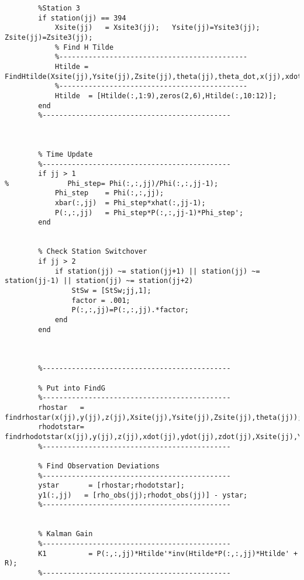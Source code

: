 \documentclass[12pt,a4paper,oneside]{article}
\numberwithin{equation}{section}   		%
\begin{document}
\begin{appendices}
\begin{lstlisting}
        %Station 3
        if station(jj) == 394
            Xsite(jj)   = Xsite3(jj);   Ysite(jj)=Ysite3(jj);   Zsite(jj)=Zsite3(jj);
            % Find H Tilde
            %---------------------------------------------
            Htilde = FindHtilde(Xsite(jj),Ysite(jj),Zsite(jj),theta(jj),theta_dot,x(jj),xdot(jj),y(jj),ydot(jj),z(jj),zdot(jj));
            %---------------------------------------------
            Htilde  = [Htilde(:,1:9),zeros(2,6),Htilde(:,10:12)];
        end
        %---------------------------------------------
        
        
        
        % Time Update
        %---------------------------------------------
        if jj > 1
%              Phi_step= Phi(:,:,jj)/Phi(:,:,jj-1);
            Phi_step    = Phi(:,:,jj);
            xbar(:,jj)  = Phi_step*xhat(:,jj-1);
            P(:,:,jj)   = Phi_step*P(:,:,jj-1)*Phi_step';
        end

        
        % Check Station Switchover
        if jj > 2
            if station(jj) ~= station(jj+1) || station(jj) ~= station(jj-1) || station(jj) ~= station(jj+2)
                StSw = [StSw;jj,1];
                factor = .001;
                P(:,:,jj)=P(:,:,jj).*factor;
            end
        end
            
        
        
        %---------------------------------------------
            
        % Put into FindG
        %---------------------------------------------
        rhostar   = findrhostar(x(jj),y(jj),z(jj),Xsite(jj),Ysite(jj),Zsite(jj),theta(jj));
        rhodotstar= findrhodotstar(x(jj),y(jj),z(jj),xdot(jj),ydot(jj),zdot(jj),Xsite(jj),Ysite(jj),Zsite(jj),theta(jj),theta_dot,rhostar);
        %---------------------------------------------
        
        % Find Observation Deviations
        %---------------------------------------------
        ystar       = [rhostar;rhodotstar];
        y1(:,jj)   = [rho_obs(jj);rhodot_obs(jj)] - ystar;
        %---------------------------------------------
        
        
        % Kalman Gain
        %---------------------------------------------
        K1          = P(:,:,jj)*Htilde'*inv(Htilde*P(:,:,jj)*Htilde' + R);
        %---------------------------------------------
        

\end{lstlisting}
\end{appendices}
\end{document}
